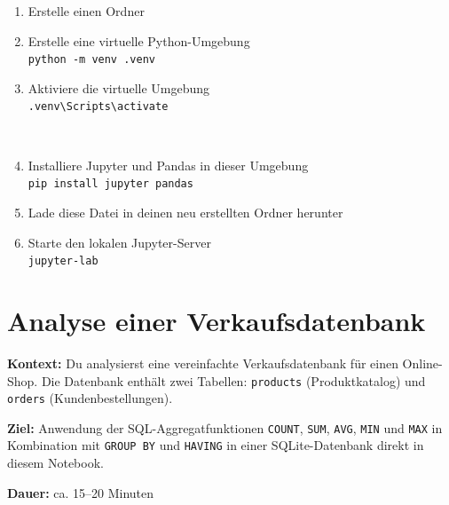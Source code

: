 \documentclass[
  nswissgerman,
  a4paper,
  DIV=11,
  numbers=noendperiod,
  ngerman]{scrreprt}
\providecommand{\tightlist}{%
  \setlength{\itemsep}{0pt}\setlength{\parskip}{0pt}}
\begin{document}
\begin{tcolorbox}[enhanced jigsaw, arc=.35mm, bottomrule=.15mm, bottomtitle=1mm, breakable, colback=white, colbacktitle=quarto-callout-note-color!10!white, colframe=quarto-callout-note-color-frame, coltitle=black, left=2mm, leftrule=.75mm, opacityback=0, opacitybacktitle=0.6, rightrule=.15mm, title=\textcolor{quarto-callout-note-color}{\faInfo}\hspace{0.5em}{Wie man dieses Notebook lokal ausführt}, titlerule=0mm, toprule=.15mm, toptitle=1mm]

\begin{enumerate}
\def\labelenumi{\arabic{enumi}.}
\tightlist
\item
  Erstelle einen Ordner
\item
  Erstelle eine virtuelle Python-Umgebung\\
  \texttt{python\ -m\ venv\ .venv}
\item
  Aktiviere die virtuelle Umgebung\\
  \texttt{.venv\textbackslash{}Scripts\textbackslash{}activate}\strut \\
\item
  Installiere Jupyter und Pandas in dieser Umgebung\\
  \texttt{pip\ install\ jupyter\ pandas}
\item
  Lade diese Datei in deinen neu erstellten Ordner herunter
\item
  Starte den lokalen Jupyter-Server\\
  \texttt{jupyter-lab}
\end{enumerate}

\end{tcolorbox}

\section{Analyse einer
Verkaufsdatenbank}\label{analyse-einer-verkaufsdatenbank}

\textbf{Kontext:} Du analysierst eine vereinfachte Verkaufsdatenbank für
einen Online-Shop. Die Datenbank enthält zwei Tabellen:
\texttt{products} (Produktkatalog) und \texttt{orders}
(Kundenbestellungen).

\textbf{Ziel:} Anwendung der SQL-Aggregatfunktionen \texttt{COUNT},
\texttt{SUM}, \texttt{AVG}, \texttt{MIN} und \texttt{MAX} in Kombination
mit \texttt{GROUP\ BY} und \texttt{HAVING} in einer SQLite-Datenbank
direkt in diesem Notebook.

\textbf{Dauer:} ca. 15--20 Minuten
\end{document}
